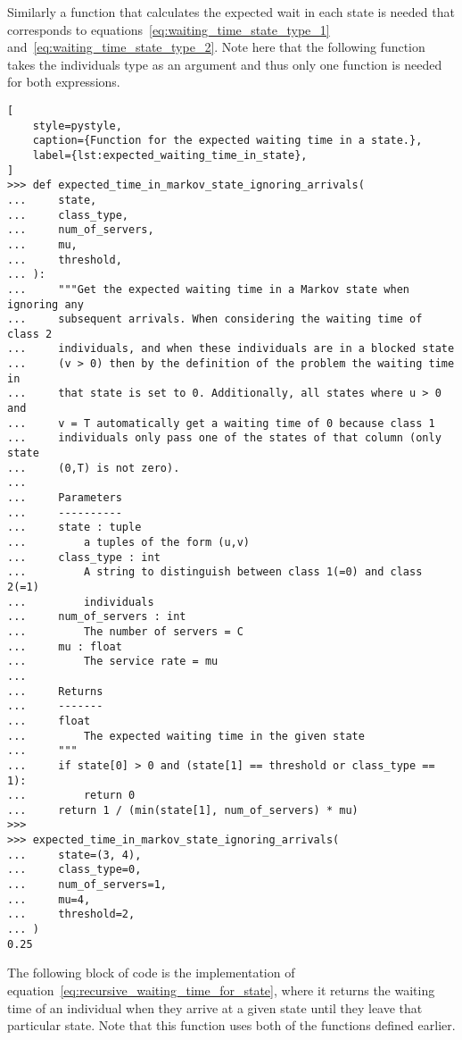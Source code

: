 Similarly a function that calculates the expected wait in each state is needed
that corresponds to equations~\eqref{eq:waiting_time_state_type_1}
and~\eqref{eq:waiting_time_state_type_2}.
Note here that the following function takes the individuals type as an argument
and thus only one function is needed for both expressions.

\begin{lstlisting}[
    style=pystyle,
    caption={Function for the expected waiting time in a state.},
    label={lst:expected_waiting_time_in_state},
]
>>> def expected_time_in_markov_state_ignoring_arrivals(
...     state,
...     class_type,
...     num_of_servers,
...     mu,
...     threshold,
... ):
...     """Get the expected waiting time in a Markov state when ignoring any
...     subsequent arrivals. When considering the waiting time of class 2
...     individuals, and when these individuals are in a blocked state
...     (v > 0) then by the definition of the problem the waiting time in
...     that state is set to 0. Additionally, all states where u > 0 and
...     v = T automatically get a waiting time of 0 because class 1
...     individuals only pass one of the states of that column (only state
...     (0,T) is not zero).
... 
...     Parameters
...     ----------
...     state : tuple
...         a tuples of the form (u,v)
...     class_type : int
...         A string to distinguish between class 1(=0) and class 2(=1)
...         individuals
...     num_of_servers : int
...         The number of servers = C
...     mu : float
...         The service rate = mu
... 
...     Returns
...     -------
...     float
...         The expected waiting time in the given state
...     """
...     if state[0] > 0 and (state[1] == threshold or class_type == 1):
...         return 0
...     return 1 / (min(state[1], num_of_servers) * mu)
>>>
>>> expected_time_in_markov_state_ignoring_arrivals(
...     state=(3, 4),
...     class_type=0,
...     num_of_servers=1,
...     mu=4,
...     threshold=2,
... )
0.25

\end{lstlisting}

The following block of code is the implementation of
equation~\eqref{eq:recursive_waiting_time_for_state}, where it returns the
waiting time of an individual when they arrive at a given state until they
leave that particular state.
Note that this function uses both of the functions defined earlier.


